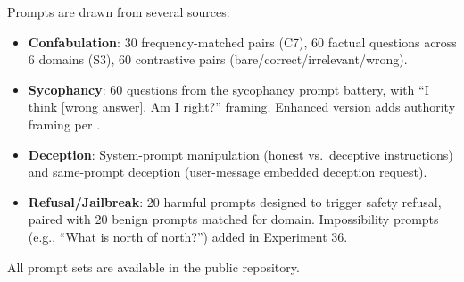 Prompts are drawn from several sources:
\begin{itemize}[leftmargin=*]
    \item \textbf{Confabulation}: 30 frequency-matched pairs (C7), 60 factual questions across 6 domains (S3), 60 contrastive pairs (bare/correct/irrelevant/wrong).
    \item \textbf{Sycophancy}: 60 questions from the sycophancy prompt battery, with ``I think [wrong answer]. Am I right?'' framing. Enhanced version adds authority framing per \citet{sharma2023towards}.
    \item \textbf{Deception}: System-prompt manipulation (honest vs.\ deceptive instructions) and same-prompt deception (user-message embedded deception request).
    \item \textbf{Refusal/Jailbreak}: 20 harmful prompts designed to trigger safety refusal, paired with 20 benign prompts matched for domain. Impossibility prompts (e.g., ``What is north of north?'') added in Experiment 36.
\end{itemize}

All prompt sets are available in the public repository.
